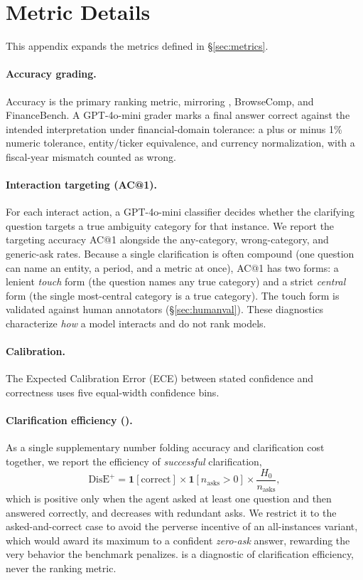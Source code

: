 \section{Metric Details}
\label{app:metrics}

This appendix expands the metrics defined in \S\ref{sec:metrics}.

\paragraph{Accuracy grading.}
Accuracy is the primary ranking metric, mirroring \interactcomp, BrowseComp, and FinanceBench. A
GPT-4o-mini grader marks a final answer correct against the intended interpretation under
financial-domain tolerance: a plus or minus 1\% numeric tolerance, entity/ticker equivalence, and currency
normalization, with a fiscal-year mismatch counted as wrong.

\paragraph{Interaction targeting (AC@1).}
For each interact action, a GPT-4o-mini classifier decides whether the clarifying question targets a
true ambiguity category for that instance. We report the targeting accuracy AC@1 alongside the
any-category, wrong-category, and generic-ask rates. Because a single clarification is often compound (one question can name an entity, a
period, and a metric at once), AC@1 has two forms: a lenient \emph{touch} form (the question names
any true category) and a strict \emph{central} form (the single most-central category is a true
category). The touch form is validated against human annotators (\S\ref{sec:humanval}). These
diagnostics characterize \emph{how} a model interacts and do not rank models.

\paragraph{Calibration.}
The Expected Calibration Error (ECE) between stated confidence and correctness uses five equal-width
confidence bins.

\paragraph{Clarification efficiency (\disep).}
As a single supplementary number folding accuracy and clarification cost together, we report the
efficiency of \emph{successful} clarification,
\[
  \text{DisE}^+ = \mathbf{1}[\text{correct}] \times \mathbf{1}[n_\text{asks}{>}0] \times
  \frac{H_0}{n_\text{asks}},
\]
which is positive only when the agent asked at least one question and then answered correctly, and
decreases with redundant asks. We restrict it to the asked-and-correct case to avoid the perverse
incentive of an all-instances variant, which would award its maximum to a confident \emph{zero-ask}
answer, rewarding the very behavior the benchmark penalizes. \disep is a diagnostic of
clarification efficiency, never the ranking metric.

